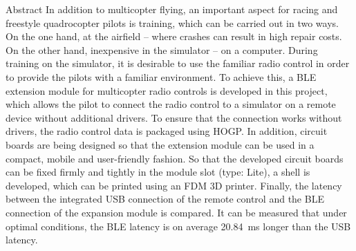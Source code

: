\begin{abstractpage}
    \begin{abstractsection}{Abstract}
      In addition to multicopter flying, an important aspect for racing and freestyle quadrocopter pilots is training, which can be carried out in two ways. On the one hand, at the airfield -- where crashes can result in high repair costs. On the other hand, inexpensive in the simulator -- on a computer. During training on the simulator, it is desirable to use the familiar radio control in order to provide the pilots with a familiar environment. To achieve this, a \acs{BLE} extension module for multicopter radio controls is developed in this project, which allows the pilot to connect the radio control to a simulator on a remote device without additional drivers. To ensure that the connection works without drivers, the radio control data is packaged using \acs{HOGP}. In addition, circuit boards are being designed so that the extension module can be used in a compact, mobile and user-friendly fashion. So that the developed circuit boards can be fixed firmly and tightly in the module slot (type: Lite), a shell is developed, which can be printed using an \acs{FDM} 3D printer. Finally, the latency between the integrated \acs{USB} connection of the remote control and the \acs{BLE} connection of the expansion module is compared. It can be measured that under optimal conditions, the \acs{BLE} latency is on average 20.84~ms longer than the \acs{USB} latency. 
    \end{abstractsection}
\end{abstractpage}